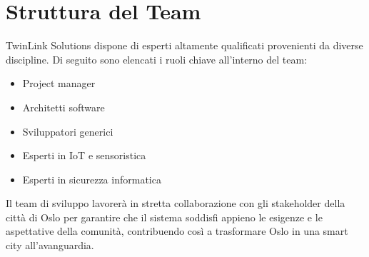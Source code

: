 \section{Struttura del Team}

TwinLink Solutions dispone di esperti altamente qualificati provenienti da diverse discipline. Di seguito sono elencati i ruoli chiave all'interno del team:

\begin{itemize}
    \item Project manager
    \item Architetti software
    \item Sviluppatori generici
    \item Esperti in IoT e sensoristica
    \item Esperti in sicurezza informatica
\end{itemize}

Il team di sviluppo lavorerà in stretta collaborazione con gli stakeholder della città di Oslo per garantire che il sistema soddisfi appieno le esigenze e le aspettative della comunità, contribuendo così a trasformare Oslo in una smart city all'avanguardia.

